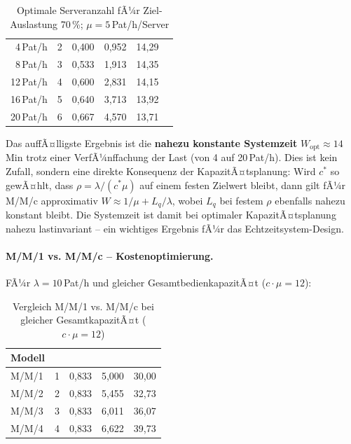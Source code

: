 ﻿\documentclass[a4paper,12pt]{scrreprt}
\theoremstyle{definition}
\begin{document}
\begin{table}[H]
	\centering
	\begin{tabular}{@{}rrrrrr@{}}
		\toprule
		\boldmath{$\lambda$} & \boldmath{$c^*$} & \boldmath{$\rho_\text{opt}$} &
		\boldmath{$L_\text{opt}$} & \boldmath{$W_\text{opt}$\,(Min)} \\
		\midrule
		4\,Pat/h & 2 & 0{,}400 &  0{,}952 & 14{,}29 \\
		8\,Pat/h & 3 & 0{,}533 &  1{,}913 & 14{,}35 \\
		12\,Pat/h & 4 & 0{,}600 &  2{,}831 & 14{,}15 \\
		16\,Pat/h & 5 & 0{,}640 &  3{,}713 & 13{,}92 \\
		20\,Pat/h & 6 & 0{,}667 &  4{,}570 & 13{,}71 \\
		\bottomrule
	\end{tabular}
	\caption{Optimale Serveranzahl fÃ¼r Ziel-Auslastung 70\,\%; $\mu = 5$\,Pat/h/Server}
	\label{tab:kapazitaet}
\end{table}

Das auffÃ¤lligste Ergebnis ist die \textbf{nahezu konstante Systemzeit}
$W_\text{opt} \approx 14$\,Min trotz einer VerfÃ¼nffachung der Last
(von 4 auf 20\,Pat/h). Dies ist kein Zufall, sondern eine direkte
Konsequenz der KapazitÃ¤tsplanung: Wird $c^*$ so gewÃ¤hlt, dass
$\rho = \lambda/(c^* \mu)$ auf einem festen Zielwert bleibt, dann
gilt fÃ¼r M/M/c approximativ $W \approx 1/\mu + L_q/\lambda$, wobei
$L_q$ bei festem $\rho$ ebenfalls nahezu konstant bleibt. Die Systemzeit
ist damit bei optimaler KapazitÃ¤tsplanung nahezu lastinvariant --
ein wichtiges Ergebnis fÃ¼r das Echtzeitsystem-Design.

\paragraph{M/M/1 vs. M/M/c -- Kostenoptimierung.}
FÃ¼r $\lambda = 10$\,Pat/h und gleicher GesamtbedienkapazitÃ¤t ($c \cdot \mu = 12$):

\begin{table}[H]
	\centering
	\begin{tabular}{@{}lrrrr@{}}
		\toprule
		\textbf{Modell} & \boldmath{$c$} & \boldmath{$\rho$} &
		\boldmath{$L$} & \boldmath{$W$ (Min)} \\
		\midrule
		M/M/1 & 1 & 0{,}833 & 5{,}000 & 30{,}00 \\
		M/M/2 & 2 & 0{,}833 & 5{,}455 & 32{,}73 \\
		M/M/3 & 3 & 0{,}833 & 6{,}011 & 36{,}07 \\
		M/M/4 & 4 & 0{,}833 & 6{,}622 & 39{,}73 \\
		\bottomrule
	\end{tabular}
	\caption{Vergleich M/M/1 vs. M/M/c bei gleicher GesamtkapazitÃ¤t ($c \cdot \mu = 12$)}
	\label{tab:mmc-vergleich}
\end{table}
\end{document}
